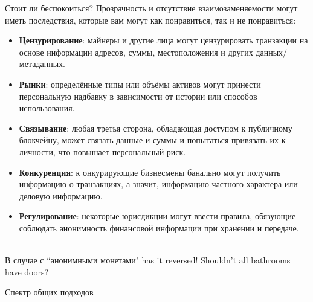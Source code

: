 \documentclass[aspectratio=169]{beamer}
\begin{document}
\begin{frame}{Стоит ли беспокоиться?}
Прозрачность и отсутствие взаимозаменяемости могут иметь последствия, которые вам могут как понравиться, так и не понравиться:

\begin{itemize}
\item \textbf{Цензурирование}: майнеры и другие лица могут цензурировать транзакции на основе информации адресов, суммы, местоположения и других данных/метаданных.
\item \textbf{Рынки}: определённые типы или объёмы активов могут принести персональную надбавку в зависимости от истории или способов использования.
\item \textbf{Связывание}: любая третья сторона, обладающая доступом к публичному блокчейну, может связать данные и суммы и попытаться привязать их к личности, что повышает персональный риск.
\item \textbf{Конкуренция}: к онкурирующие бизнесмены банально могут получить информацию о транзакциях, а значит, информацию частного характера или деловую информацию.
\item \textbf{Регулирование}: некоторые юрисдикции могут ввести правила, обязующие соблюдать анонимность финансовой информации при хранении и передаче. \\~\\
\end{itemize}

В случае с  ``анонимными монетами" has it reversed! Shouldn't all bathrooms have doors?
\end{frame}


\begin{frame}{Спектр общих подходов}
\begin{figure}
\centering
{}
\end{figure}
\end{frame}
\end{document}
